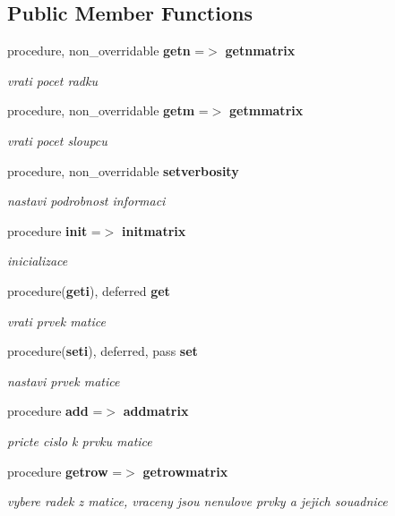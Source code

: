 \subsection*{Public Member Functions}
\begin{DoxyCompactItemize}
\item 
procedure, non\+\_\+overridable {\bf getn} =$>$ {\bf getnmatrix}
\begin{DoxyCompactList}\small\item\em vrati pocet radku \end{DoxyCompactList}\item 
procedure, non\+\_\+overridable {\bf getm} =$>$ {\bf getmmatrix}
\begin{DoxyCompactList}\small\item\em vrati pocet sloupcu \end{DoxyCompactList}\item 
procedure, non\+\_\+overridable {\bf setverbosity}
\begin{DoxyCompactList}\small\item\em nastavi podrobnost informaci \end{DoxyCompactList}\item 
procedure {\bf init} =$>$ {\bf initmatrix}
\begin{DoxyCompactList}\small\item\em inicializace \end{DoxyCompactList}\item 
procedure({\bf geti}), deferred {\bf get}
\begin{DoxyCompactList}\small\item\em vrati prvek matice \end{DoxyCompactList}\item 
procedure({\bf seti}), deferred, pass {\bf set}
\begin{DoxyCompactList}\small\item\em nastavi prvek matice \end{DoxyCompactList}\item 
procedure {\bf add} =$>$ {\bf addmatrix}
\begin{DoxyCompactList}\small\item\em pricte cislo k prvku matice \end{DoxyCompactList}\item 
procedure {\bf getrow} =$>$ {\bf getrowmatrix}
\begin{DoxyCompactList}\small\item\em vybere radek z matice, vraceny jsou nenulove prvky a jejich souadnice \end{DoxyCompactList}\item 

\end{DoxyCompactItemize}
